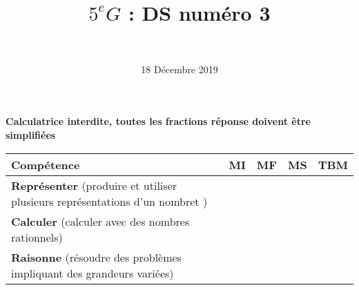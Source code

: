 \documentclass[a4paper,11pt]{exam}
\author{\ }
\date{18 Décembre 2019}
\title{$5^e G$ : DS num\'ero 3}
\begin{document}
%	

	\maketitle
	
\begin{center}
	\textbf{Calculatrice interdite, toutes les fractions réponse doivent être simplifiées}
\end{center}

\begin{small}
	\begin{center}
		\begin{tabular}{|@{\ }l@{\ }|@{\ }c@{\ }|@{\ }c@{\ }|@{\ }c@{\ }|@{\ }c@{\ }|}
			\hline
			\textbf{Compétence} & \textbf{MI} & \textbf{MF} & \textbf{MS} & \textbf{TBM} \\
			\hline
			\textbf{Représenter} (produire et utiliser plusieurs représentations d’un nombret ) &  \ \ & \ \ & \ \ & \ \  \\
			\hline
			\textbf{Calculer} (calculer avec des nombres rationnels)&  \ \ & \ \ & \ \ & \ \  \\
			\hline	
			\textbf{Raisonne} (résoudre des problèmes impliquant des grandeurs variées) & \ \ & \ \ &  \ \  & \ \ \\
			\hline
%			 
		\end{tabular}
	\end{center}
\end{small}	

	
	
	


%









\label{LastPage}

%
\end{document}
